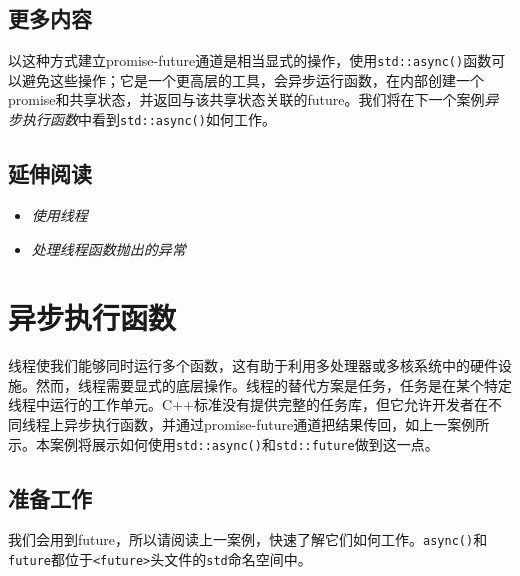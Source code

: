 
\subsection{更多内容}



以这种方式建立promise-future通道是相当显式的操作，使用\texttt{std::\allowbreak{}async()}函数可以避免这些操作；它是一个更高层的工具，会异步运行函数，在内部创建一个promise和共享状态，并返回与该共享状态关联的future。我们将在下一个案例\textit{异步执行函数}中看到\texttt{std::\allowbreak{}async()}如何工作。



\subsection{延伸阅读}



\begin{itemize}
\item \textit{使用线程}



\item \textit{处理线程函数抛出的异常}

\end{itemize}



\section{异步执行函数}



线程使我们能够同时运行多个函数，这有助于利用多处理器或多核系统中的硬件设施。然而，线程需要显式的底层操作。线程的替代方案是任务，任务是在某个特定线程中运行的工作单元。C++标准没有提供完整的任务库，但它允许开发者在不同线程上异步执行函数，并通过promise-future通道把结果传回，如上一案例所示。本案例将展示如何使用\texttt{std::\allowbreak{}async()}和\texttt{std::\allowbreak{}future}做到这一点。



\subsection{准备工作}



我们会用到future，所以请阅读上一案例，快速了解它们如何工作。\texttt{async()}和\texttt{future}都位于\texttt{<\allowbreak{}future>}头文件的\texttt{std}命名空间中。


